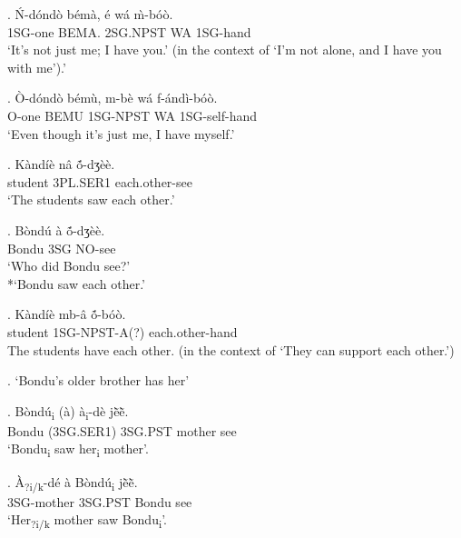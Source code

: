 \documentclass{assets/fieldnotes}
\begin{document}
\exg. \'{N}-d\'{o}nd\`{o} b\'{e}m\`{a}, \'{e} w\'{a} \`{m}-b\'{o}\`{o}. \\
1SG-one BEMA. 2SG.NPST WA 1SG-hand \\
`It's not just me; I have you.' (in the context of `I'm not alone, and I have you with me').' 

\exg. \`{O}-d\'{o}nd\`{o} b\'{e}m\`{u}, m-b\`{e} w\'{a} f-\'{a}nd\`{i}-b\'{o}\`{o}. \\
O-one BEMU 1SG-NPST WA 1SG-self-hand \\
`Even though it's just me, I have myself.' 

\exg. K\`{a}nd\'{i}\`{e} n\^{a} \textipa{\textltailn}ṍ-dʒ\`{e}\`{e}. \\
student 3PL.SER1 each.other-see \\
`The students saw each other.' 

\exg. B\`{o}nd\'{u} \`{a} \textipa{\textltailn}ṍ-dʒ\`{e}\`{e}. \\
Bondu 3SG NO-see \\
`Who did Bondu see?' \\
*`Bondu saw each other.' 

\exg. K\`{a}nd\'{i}\`{e} mb-\^{a} \textipa{\textltailn}ṍ-b\'{o}\`{o}. \\
student 1SG-NPST-A(?) each.other-hand \\
The students have each other. (in the context of `They can support each other.') 

\ex. `Bondu's older brother has her'


\exg. B\`{o}nd\'{u}\textsubscript{i} (\`{a}) \`{a}\textsubscript{i}-d\`{e} jẽ̀ẽ̀. \\
Bondu (3SG.SER1) 3SG.PST mother see \\
`Bondu\textsubscript{i} saw her\textsubscript{i} mother'. 

\exg. \`{A}\textsubscript{?i/k}-d\'{e} \`{a} B\`{o}nd\'{u}\textsubscript{i} jẽ̀ẽ̀. \\
3SG-mother 3SG.PST Bondu see \\
`Her\textsubscript{?i/k} mother saw Bondu\textsubscript{i}'. 
\end{document}
